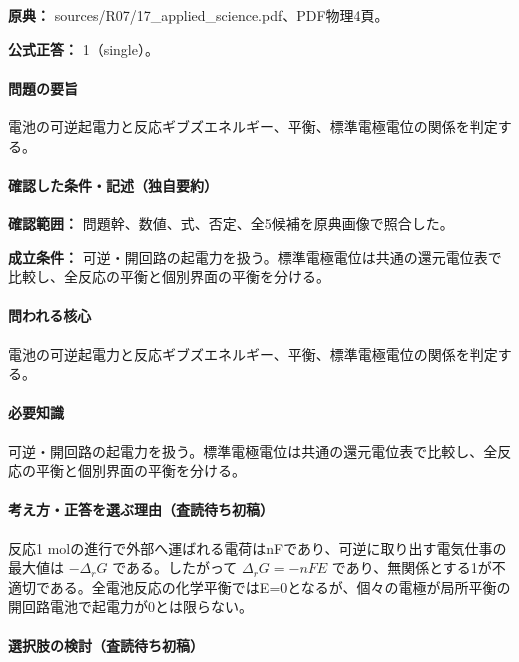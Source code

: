\noindent\textbf{原典：} sources/R07/17\_applied\_science.pdf、PDF物理4頁。

\textbf{公式正答：} 1（single）。

\paragraph{問題の要旨} 電池の可逆起電力と反応ギブズエネルギー、平衡、標準電極電位の関係を判定する。

\paragraph{確認した条件・記述（独自要約）}\mbox{}\par

\noindent\textbf{確認範囲：} 問題幹、数値、式、否定、全5候補を原典画像で照合した。\par

\noindent\textbf{成立条件：} 可逆・開回路の起電力を扱う。標準電極電位は共通の還元電位表で比較し、全反応の平衡と個別界面の平衡を分ける。\par

\paragraph{問われる核心} 電池の可逆起電力と反応ギブズエネルギー、平衡、標準電極電位の関係を判定する。

\paragraph{必要知識} 可逆・開回路の起電力を扱う。標準電極電位は共通の還元電位表で比較し、全反応の平衡と個別界面の平衡を分ける。

\paragraph{考え方・正答を選ぶ理由（査読待ち初稿）} 反応1 molの進行で外部へ運ばれる電荷はnFであり、可逆に取り出す電気仕事の最大値は \(-\Delta_rG\) である。したがって \(\Delta_rG=-nFE\) であり、無関係とする1が不適切である。全電池反応の化学平衡ではE=\allowbreak{}0となるが、個々の電極が局所平衡の開回路電池で起電力が0とは限らない。

\paragraph{選択肢の検討（査読待ち初稿）}\mbox{}\par

